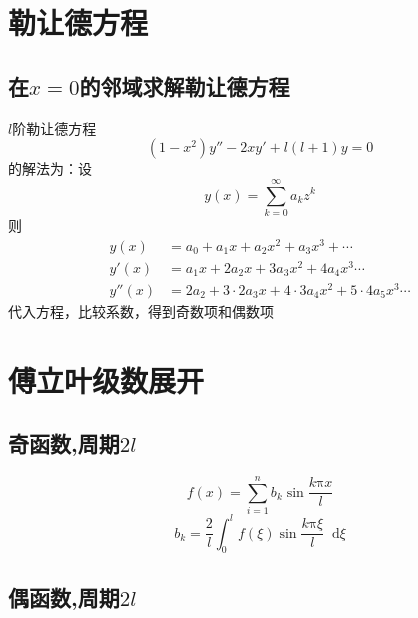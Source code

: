 \documentclass{article}
\newcommand*{\md}{\mathop{}\!\mathrm{d}}
\begin{document}
\section{勒让德方程}

\subsection{在$x=0$的邻域求解勒让德方程}

$l$阶勒让德方程
\begin{equation*}
  \label{eq:1}
  \left( 1 - x^{2} \right) y'' - 2 x y' + l \left( l + 1 \right) y = 0
\end{equation*}
的解法为：设
\begin{equation*}
  \label{eq:2}
  y \left( x \right) = \sum\limits_{k = 0}^{\infty} a_{k} z^{k}
\end{equation*}
则
\begin{equation*}
  \begin{aligned}
    y \left( x\right) &= a_{0} + a_{1}x + a_{2}x^{2} + a_{3}x^{3} + \cdots \\
    y' \left( x \right) &= a_{1}x + 2 a_{2}x + 3 a_{3}x^{2} + 4 a_{4}x^{3} \cdots \\
    y'' \left( x \right) &= 2 a_{2} + 3 \cdot 2  a_{3}x + 4 \cdot 3 a_{4}x^{2} + 5 \cdot 4 a_{5} x^{3} \cdots
  \end{aligned}
\end{equation*}
代入方程，比较系数，得到奇数项和偶数项

\section{傅立叶级数展开}

\subsection{奇函数,周期$2l$}

\begin{equation*}
  f(x) = \sum\limits_{i=1}^{n}b_{k} \sin \dfrac{k \mathrm{\pi} x}{l} 
\end{equation*}
\begin{equation*}
  b_{k} = \dfrac{2}{l} \int_{0}^{l} f(\xi) \sin \dfrac{k \mathrm{\pi} \xi}{l} \md \xi 
\end{equation*}
\subsection{偶函数,周期$2l$}
\end{document}
